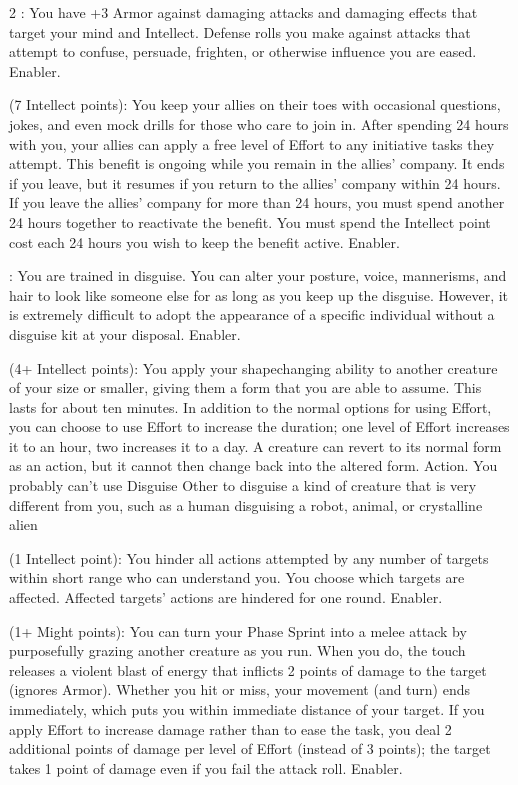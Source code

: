 \begin{multicols}{2}
: You have +3 Armor against damaging attacks and damaging effects that target your mind and Intellect. Defense rolls you make against attacks that attempt to confuse, persuade, frighten, or otherwise influence you are eased. Enabler. 

 (7 Intellect points): You keep your allies on their toes with occasional questions, jokes, and even mock drills for those who care to join in. After spending 24 hours with you, your allies can apply a free level of Effort to any initiative tasks they attempt. This benefit is ongoing while you remain in the allies’ company. It ends if you leave, but it resumes if you return to the allies’ company within 24 hours. If you leave the allies’ company for more than 24 hours, you must spend another 24 hours together to reactivate the benefit. You must spend the Intellect point cost each 24 hours you wish to keep the benefit active. Enabler.

: You are trained in disguise. You can alter your posture, voice, mannerisms, and hair to look like someone else for as long as you keep up the disguise. However, it is extremely difficult to adopt the appearance of a specific individual without a disguise kit at your disposal. Enabler.

 (4+ Intellect points): You apply your shapechanging ability to another creature of your size or smaller, giving them a form that you are able to assume. This lasts for about ten minutes.
In addition to the normal options for using Effort, you can choose to use Effort to increase the duration; one level of Effort increases it to an hour, two increases it to a day. A creature can revert to its normal form as an action, but it cannot then change back into the altered form. Action.
	You probably can’t use Disguise Other to disguise a kind of creature that is very different from you, such as a human disguising a robot, animal, or crystalline alien 

 (1 Intellect point): You hinder all actions attempted by any number of targets within short range who can understand you. You choose which targets are affected. Affected targets’ actions are hindered for one round. Enabler. 

 (1+ Might points): You can turn your Phase Sprint into a melee attack by purposefully grazing another creature as you run. When you do, the touch releases a violent blast of energy that inflicts 2 points of damage to the target (ignores Armor). Whether you hit or miss, your movement (and turn) ends immediately, which puts you within immediate distance of your target. If you apply Effort to increase damage rather than to ease the task, you deal 2 additional points of damage per level of Effort (instead of 3 points); the target takes 1 point of damage even if you fail the attack roll. Enabler. 


\end{multicols}
